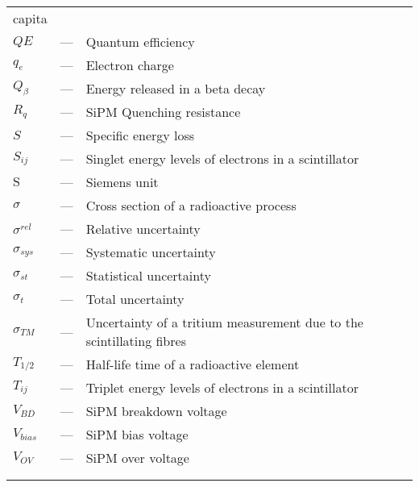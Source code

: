 \begin{longtable}{p{25mm} c p{120mm} }
\newline
capita\\
$QE$ & --- & Quantum efficiency\\
$q_{e}$ & --- & Electron charge\\
$Q_\beta$ & --- & Energy released in a beta decay\\
$R_q$ & --- & SiPM Quenching resistance\\
$S$ & --- & Specific energy loss\\
$S_{ij}$ & --- & Singlet energy levels of electrons in a 
\newline
scintillator\\
$\text{S}$ & --- & Siemens unit\\
$\sigma$ & --- & Cross section of a radioactive process\\
$\sigma^{rel}$ & --- & Relative uncertainty\\
$\sigma_{sys}$ & --- & Systematic uncertainty\\
$\sigma_{st}$ & --- & Statistical uncertainty\\
$\sigma_{t}$ & --- & Total uncertainty\\
$\sigma_{TM}$ & --- & Uncertainty of a tritium measurement
\newline
due to the scintillating fibres\\
$T_{1/2}$ & --- & Half-life time of a radioactive element\\
$T_{ij}$ & --- & Triplet energy levels of electrons in a 
\newline
scintillator\\
$V_{BD}$ & --- & SiPM breakdown voltage\\
$V_{bias}$ & --- & SiPM bias voltage\\
$V_{OV}$ & --- & SiPM over voltage\\
\\
\\

\end{longtable}
